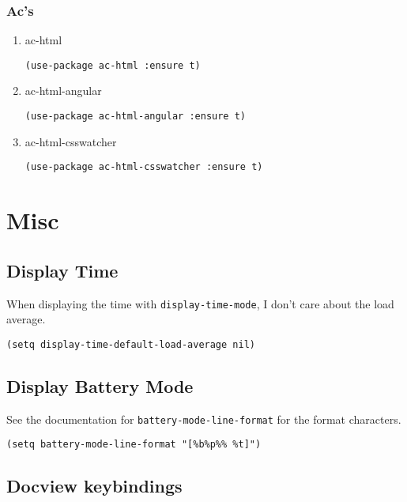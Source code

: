 \documentclass[11pt]{article}
\begin{document}
\subsubsection{Ac's}
\label{sec-20-4-5}
\begin{enumerate}
\item ac-html
\label{sec-20-4-5-1}

\begin{verbatim}
(use-package ac-html :ensure t)
\end{verbatim}
\item ac-html-angular
\label{sec-20-4-5-2}
\begin{verbatim}
(use-package ac-html-angular :ensure t)
\end{verbatim}
\item ac-html-csswatcher
\label{sec-20-4-5-3}

\begin{verbatim}
(use-package ac-html-csswatcher :ensure t)
\end{verbatim}
\end{enumerate}

\section{Misc}
\label{sec-21}
\subsection{Display Time}
\label{sec-21-1}

When displaying the time with \texttt{display-time-mode}, I don't care about
the load average.

\begin{verbatim}
(setq display-time-default-load-average nil)
\end{verbatim}

\subsection{Display Battery Mode}
\label{sec-21-2}

See the documentation for \texttt{battery-mode-line-format} for the format
characters.

\begin{verbatim}
(setq battery-mode-line-format "[%b%p%% %t]")
\end{verbatim}

\subsection{Docview keybindings}
\label{sec-21-3}
\end{document}
